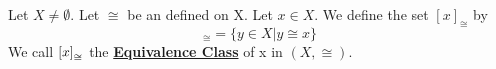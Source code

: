 \label{def:EquivalenceClass}
\newcommand{\EquivalenceClass}[0]{\textbf{\hyperref[def:EquivalenceClass]{Equivalence Class}}\xspace}
\newcommand{\EqClass}[2]{\bra{#1}_{\cong}\xspace}
\begin{df}
    
    Let $X \neq \emptyset$.
    Let $\cong$ be an 
	\EquivalenceRelation
	defined on X.  
    Let $x \in X$. 
    We define the set $[x]_{\cong}$ by 
    \begin{equation}
        [x]_{\cong} = \{y \in X | y \cong x\}
    \end{equation} 
    We call $\EqClass{x}{\cong}$ the \EquivalenceClass of x in $(X, \cong)$. 
\end{df}
